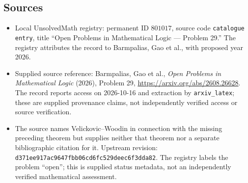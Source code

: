 \documentclass[11pt]{article}
\begin{document}
\subsection{Sources}
\begin{itemize}
\item Local UnsolvedMath registry: permanent ID \(801017\), source code \texttt{catalogue entry}, title ``Open Problems in Mathematical Logic --- Problem 29.'' The registry attributes the record to Barmpalias, Gao et al., with proposed year 2026.
\item Supplied source reference: Barmpalias, Gao et al., \emph{Open Problems in Mathematical Logic} (2026), Problem 29, \url{https://arxiv.org/abs/2608.26628}. The record reports access on 2026-10-16 and extraction by \texttt{arxiv\_latex}; these are supplied provenance claims, not independently verified access or source verification.
\item The source names Velickovic--Woodin in connection with the missing preceding theorem but supplies neither that theorem nor a separate bibliographic citation for it. Upstream revision: \texttt{d371ee917ac9647fbb06cd6fc529deec6f3dda82}. The registry labels the problem ``open''; this is supplied status metadata, not an independently verified mathematical assessment.
\end{itemize}
\end{document}
